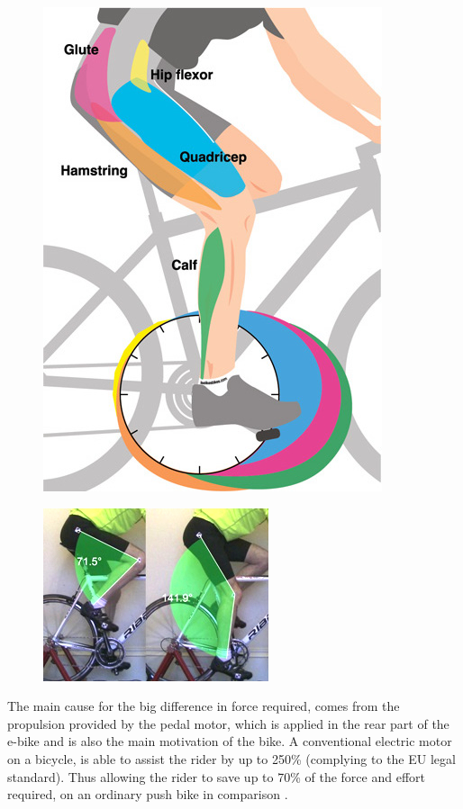 \documentclass[a4paper,11pt]{article}
\begin{document}
\begin{figure}[!ht]
\centering
	\begin{minipage}{.5\textwidth}
		  \centering
		  \includegraphics[width=.4\linewidth]{peds}
		  \label{fig:peds}
		  \cite{lee08}
	\end{minipage}%
	\begin{minipage}{.5\textwidth}
		  \centering
		  \includegraphics[width=.75\linewidth]{knex}
		  \label{fig:knex}
		  \cite{bd16}
	\end{minipage}
\end{figure}

The main cause for the big difference in force required, comes from the propulsion provided by the pedal motor, which is applied in the rear part of the e-bike and is also the main motivation of the bike. A conventional electric motor on a bicycle, is able to assist the rider by up to 250\% (complying to the EU legal standard). Thus allowing the rider to save up to 70\% of the force and effort required, on an ordinary push bike in comparison \cite{bosch18}.
\end{document}
